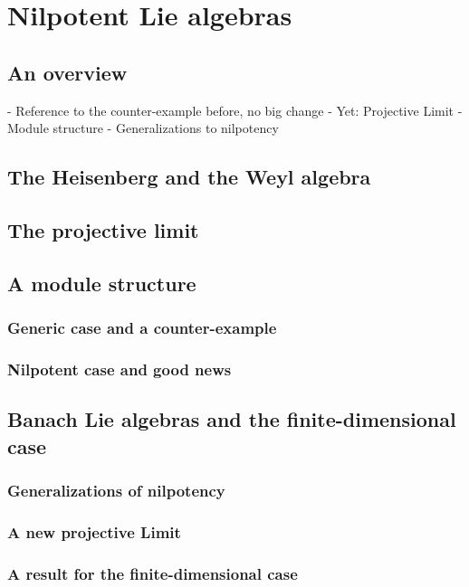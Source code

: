 
%
%

\chapter{Nilpotent Lie algebras}

\section{An overview}
\label{sec:chap6_overview}
 - Reference to the counter-example before, no big change
 - Yet: Projective Limit
 - Module structure
 - Generalizations to nilpotency
 
 
 
\section{The Heisenberg and the Weyl algebra}
\label{sec:chap6_HeisenbergWeyl}


 
\section{The projective limit} 
\label{sec:chap6_ProjLim} 
 
 
 
\section{A module structure}
\label{sec:chap6_Modules}
 
\subsection{Generic case and a counter-example}

\subsection{Nilpotent case and good news}



\section{Banach Lie algebras and the finite-dimensional case}
\label{sec:chap6_TheEProperty}

\subsection{Generalizations of nilpotency}

\subsection{A new projective Limit}

\subsection{A result for the finite-dimensional case}
